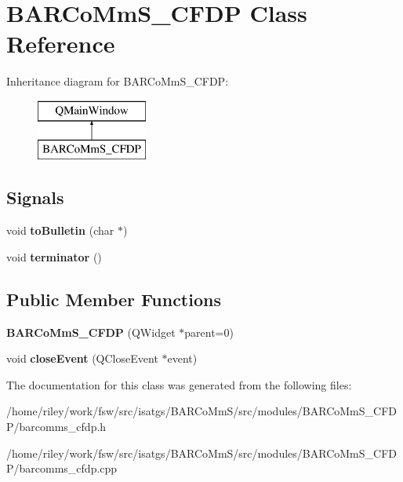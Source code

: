 \hypertarget{class_b_a_r_co_mm_s___c_f_d_p}{}\section{B\+A\+R\+Co\+Mm\+S\+\_\+\+C\+F\+DP Class Reference}
\label{class_b_a_r_co_mm_s___c_f_d_p}
Inheritance diagram for B\+A\+R\+Co\+Mm\+S\+\_\+\+C\+F\+DP\+:\begin{figure}[H]
\begin{center}
\leavevmode
\includegraphics[height=2.000000cm]{class_b_a_r_co_mm_s___c_f_d_p}
\end{center}
\end{figure}
\subsection*{Signals}
\begin{DoxyCompactItemize}
\item 
void {\bfseries to\+Bulletin} (char $\ast$)\hypertarget{class_b_a_r_co_mm_s___c_f_d_p_a975b37b480250f8b8b7c38264b821283}{}\label{class_b_a_r_co_mm_s___c_f_d_p_a975b37b480250f8b8b7c38264b821283}

\item 
void {\bfseries terminator} ()\hypertarget{class_b_a_r_co_mm_s___c_f_d_p_acf41dbaeaa1587919298d11e1d2030b8}{}\label{class_b_a_r_co_mm_s___c_f_d_p_acf41dbaeaa1587919298d11e1d2030b8}

\end{DoxyCompactItemize}
\subsection*{Public Member Functions}
\begin{DoxyCompactItemize}
\item 
{\bfseries B\+A\+R\+Co\+Mm\+S\+\_\+\+C\+F\+DP} (Q\+Widget $\ast$parent=0)\hypertarget{class_b_a_r_co_mm_s___c_f_d_p_a7b019e2adc1c17e4dcf74d71ec493454}{}\label{class_b_a_r_co_mm_s___c_f_d_p_a7b019e2adc1c17e4dcf74d71ec493454}

\item 
void {\bfseries close\+Event} (Q\+Close\+Event $\ast$event)\hypertarget{class_b_a_r_co_mm_s___c_f_d_p_ad1562e35303a406ca01e5224dffa051f}{}\label{class_b_a_r_co_mm_s___c_f_d_p_ad1562e35303a406ca01e5224dffa051f}

\end{DoxyCompactItemize}


The documentation for this class was generated from the following files\+:\begin{DoxyCompactItemize}
\item 
/home/riley/work/fsw/src/isatgs/\+B\+A\+R\+Co\+Mm\+S/src/modules/\+B\+A\+R\+Co\+Mm\+S\+\_\+\+C\+F\+D\+P/barcomms\+\_\+cfdp.\+h\item 
/home/riley/work/fsw/src/isatgs/\+B\+A\+R\+Co\+Mm\+S/src/modules/\+B\+A\+R\+Co\+Mm\+S\+\_\+\+C\+F\+D\+P/barcomms\+\_\+cfdp.\+cpp\end{DoxyCompactItemize}
